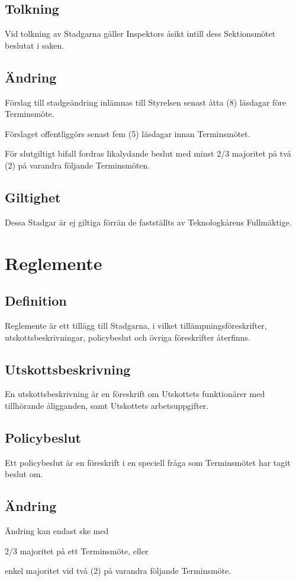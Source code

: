 \documentclass[10pt]{article}
\begin{document}
\subsection{Tolkning}
Vid tolkning av Stadgarna gäller Inspektors åsikt intill dess Sektionsmötet
beslutat i saken.

\subsection{Ändring}
Förslag till stadgeändring inlämnas till Styrelsen senast åtta (8) läsdagar
före Terminsmöte.

Förslaget offentliggörs senast fem (5) läsdagar innan Terminsmötet.

För slutgiltigt bifall fordras likalydande beslut med minst 2/3 majoritet på
två (2) på varandra följande Terminsmöten.

\subsection{Giltighet}
Dessa Stadgar är ej giltiga förrän de fastställts av Teknologkårens
Fullmäktige.
\newpage

\section{Reglemente}
\subsection{Definition}
Reglemente är ett tillägg till Stadgarna, i vilket tillämpningsföreskrifter,
utskottsbeskrivningar, policybeslut och övriga föreskrifter återfinns.

\subsection{Utskottsbeskrivning}
En utskottsbeskrivning är en föreskrift om Utskottets funktionärer med
tillhörande åligganden, samt Utskottets arbetsuppgifter.

\subsection{Policybeslut}
Ett policybeslut är en föreskrift i en speciell fråga som Terminsmötet har
tagit beslut om.

\subsection{Ändring}
Ändring kan endast ske med
\begin{alphlist}
\item 2/3 majoritet på ett Terminsmöte, eller
\item enkel majoritet vid två (2) på varandra följande Terminsmöte.
\end{alphlist}
\end{document}
